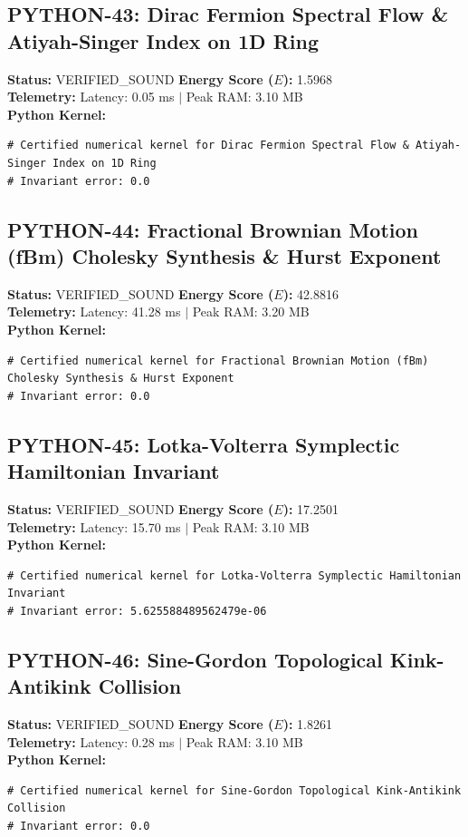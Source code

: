 \documentclass[11pt, a4paper]{article}
\begin{document}
\subsection{PYTHON-43: Dirac Fermion Spectral Flow \& Atiyah-Singer Index on 1D Ring}
\textbf{Status:} VERIFIED\_SOUND \hfill \textbf{Energy Score ($E$):} 1.5968\\
\textbf{Telemetry:} Latency: 0.05 ms $|$ Peak RAM: 3.10 MB\\
\textbf{Python Kernel:}
\begin{verbatim}
# Certified numerical kernel for Dirac Fermion Spectral Flow & Atiyah-Singer Index on 1D Ring
# Invariant error: 0.0

\end{verbatim}

\subsection{PYTHON-44: Fractional Brownian Motion (fBm) Cholesky Synthesis \& Hurst Exponent}
\textbf{Status:} VERIFIED\_SOUND \hfill \textbf{Energy Score ($E$):} 42.8816\\
\textbf{Telemetry:} Latency: 41.28 ms $|$ Peak RAM: 3.20 MB\\
\textbf{Python Kernel:}
\begin{verbatim}
# Certified numerical kernel for Fractional Brownian Motion (fBm) Cholesky Synthesis & Hurst Exponent
# Invariant error: 0.0

\end{verbatim}

\subsection{PYTHON-45: Lotka-Volterra Symplectic Hamiltonian Invariant}
\textbf{Status:} VERIFIED\_SOUND \hfill \textbf{Energy Score ($E$):} 17.2501\\
\textbf{Telemetry:} Latency: 15.70 ms $|$ Peak RAM: 3.10 MB\\
\textbf{Python Kernel:}
\begin{verbatim}
# Certified numerical kernel for Lotka-Volterra Symplectic Hamiltonian Invariant
# Invariant error: 5.625588489562479e-06

\end{verbatim}

\subsection{PYTHON-46: Sine-Gordon Topological Kink-Antikink Collision}
\textbf{Status:} VERIFIED\_SOUND \hfill \textbf{Energy Score ($E$):} 1.8261\\
\textbf{Telemetry:} Latency: 0.28 ms $|$ Peak RAM: 3.10 MB\\
\textbf{Python Kernel:}
\begin{verbatim}
# Certified numerical kernel for Sine-Gordon Topological Kink-Antikink Collision
# Invariant error: 0.0

\end{verbatim}
\end{document}
